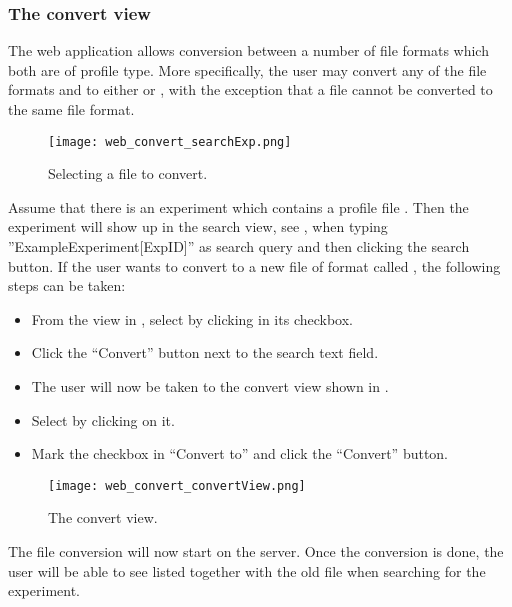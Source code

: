 \subsubsection{The convert view} \label{sssec:convertView}

The web application allows conversion between a number of file formats which both are of profile type. More specifically, the user may convert any of the file formats  and  to either  or , with the exception that a file cannot be converted to the same file format.

\begin{figure}[h]
\centering
\texttt{[image: web\_convert\_searchExp.png]}
\caption{\label{fig:web_convert_searchExp}Selecting a file to convert.}
\end{figure}

Assume that there is an experiment  which contains a profile file . Then the experiment will show up in the search view, see , when typing ”ExampleExperiment[ExpID]” as search query and then clicking the search button. If the user wants to convert  to a new file of format  called , the following steps can be taken:
\begin{itemize}
	\item From the view in , select  by clicking in its checkbox.
	\item Click the “Convert” button next to the search text field.
	\item The user will now be taken to the convert view shown in .
	\item Select  by clicking on it.
	\item Mark the  checkbox in “Convert to” and click the “Convert” button.
\end{itemize}

\begin{figure}[h]
\centering
\texttt{[image: web\_convert\_convertView.png]}
\caption{\label{fig:web_convert_convertView}The convert view.}
\end{figure}

The file conversion will now start on the server. Once the conversion is done, the user will be able to see  listed together with the old file  when searching for the experiment.

